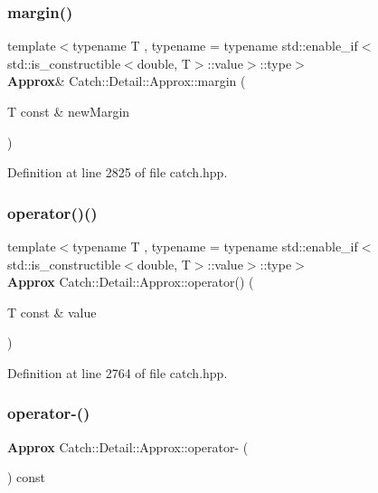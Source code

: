 \mbox{\label{class_catch_1_1_detail_1_1_approx_a6467dc18791e1a1f4c15c4fb63cf5051}} 
\subsubsection{margin()}
{\footnotesize\ttfamily template$<$typename T , typename  = typename std\+::enable\+\_\+if$<$std\+::is\+\_\+constructible$<$double, T$>$\+::value$>$\+::type$>$ \\
\textbf{ Approx}\& Catch\+::\+Detail\+::\+Approx\+::margin (\begin{DoxyParamCaption}\item[{T const \&}]{new\+Margin }\end{DoxyParamCaption})\hspace{0.3cm}{\ttfamily [inline]}}



Definition at line 2825 of file catch.\+hpp.

\mbox{\label{class_catch_1_1_detail_1_1_approx_ad8b2757f4804f9a1d3fa674efb98c20e}} 
\subsubsection{operator()()}
{\footnotesize\ttfamily template$<$typename T , typename  = typename std\+::enable\+\_\+if$<$std\+::is\+\_\+constructible$<$double, T$>$\+::value$>$\+::type$>$ \\
\textbf{ Approx} Catch\+::\+Detail\+::\+Approx\+::operator() (\begin{DoxyParamCaption}\item[{T const \&}]{value }\end{DoxyParamCaption})\hspace{0.3cm}{\ttfamily [inline]}}



Definition at line 2764 of file catch.\+hpp.

\mbox{\label{class_catch_1_1_detail_1_1_approx_aa9adf5f05e641df770039543d5067d30}} 
\subsubsection{operator-\/()}
{\footnotesize\ttfamily \textbf{ Approx} Catch\+::\+Detail\+::\+Approx\+::operator-\/ (\begin{DoxyParamCaption}{ }\end{DoxyParamCaption}) const}


